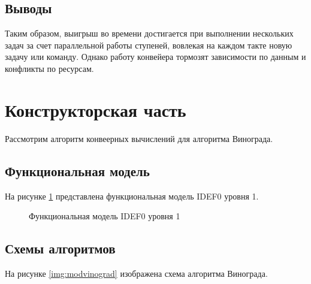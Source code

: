 \documentclass[a4paper,12pt]{article}
\begin{document}
\subsection{Выводы}

Таким образом, выигрыш во времени достигается при выполнении нескольких задач за
счет параллельной работы ступеней, вовлекая на каждом такте новую задачу или
команду. Однако работу конвейера тормозят зависимости  по данным и конфликты по ресурсам.

\newpage
\section{Конструкторская часть}

Рассмотрим алгоритм конвеерных вычислений для алгоритма Винограда.

\subsection{Функциональная модель}

На рисунке \ref{img:idef0} представлена функциональная модель IDEF0 уровня 1.

\begin{figure}[H]
    \caption{Функциональная модель IDEF0 уровня 1}
    \label{img:idef0}
\end{figure}

\subsection{Схемы алгоритмов}

На рисунке \ref{img:modvinograd} изображена схема
алгоритма Винограда.
\end{document}

